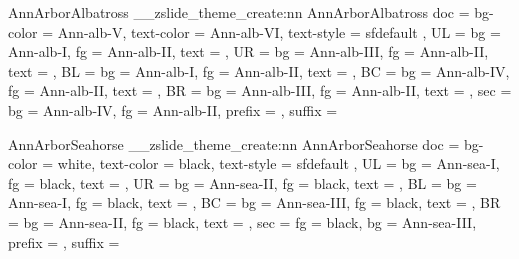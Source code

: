 {  %
  {AnnArborAlbatross}{
    \__zslide_theme_create:nn {AnnArborAlbatross}{
      doc = {
        bg-color = Ann-alb-V,
        text-color = Ann-alb-VI,
        text-style = sfdefault
      },
      UL = {
        bg   = Ann-alb-I,
        fg   = Ann-alb-II, 
        text = {\zslideUL} 
      },
      UR = {
        bg   = Ann-alb-III,
        fg   = Ann-alb-II,
        text = {\zslideUR}
      },
      BL = {
        bg   = Ann-alb-I,
        fg   = Ann-alb-II,
        text = \zslideauthor
      },
      BC = {
        bg   = Ann-alb-IV,
        fg   = Ann-alb-II,
        text = \zslidetitle
      },
      BR = {
        bg   = Ann-alb-III,
        fg   = Ann-alb-II,
        text = \zslideBR 
      },
      sec = {
        bg   = Ann-alb-IV,
        fg   = Ann-alb-II,
        prefix = {},
        suffix = {}
      }
    }
  }

  {AnnArborSeahorse}{
    \__zslide_theme_create:nn {AnnArborSeahorse}{
      doc = {
        bg-color = white,
        text-color = black,
        text-style = sfdefault
      },
      UL = {
        bg   = Ann-sea-I,
        fg   = black,
        text = {\zslideUL}
      },
      UR = {
        bg   = Ann-sea-II,
        fg   = black,
        text = {\zslideUR}
      },
      BL = {
        bg   = Ann-sea-I,
        fg   = black,
        text = \zslideauthor
      },
      BC = {
        bg   = Ann-sea-III,
        fg   = black,
        text = \zslidetitle
      },
      BR = {
        bg   = Ann-sea-II,
        fg   = black,
        text = \zslideBR
      },
      sec = {
        fg   = black,
        bg   = Ann-sea-III,
        prefix = {},
        suffix = {}
      }
    }
  }

}
